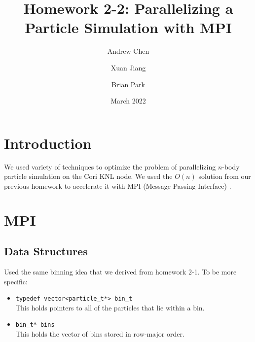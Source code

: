 \documentclass{article}
\title{Homework 2-2: Parallelizing a Particle Simulation with MPI}
\author{Andrew Chen}
\author{Xuan Jiang}
\author{Brian Park}
\affil{UC Berkeley, Computer Science 267}
\date{March 2022}
\begin{document}
\maketitle
\section{Introduction}
We used variety of techniques to optimize the problem of parallelizing $n$-body particle simulation on the Cori KNL node. We used the $O(n)$ solution from our previous homework to accelerate it with MPI (Message Passing Interface) \cite{mpi}.

\section{MPI} 

\subsection{Data Structures}
Used the same binning idea that we derived from homework 2-1. To be more specific:

\begin{itemize}
    \item \verb|typedef vector<particle_t*> bin_t| \\
        This holds pointers to all of the particles that lie within a bin.
    \item \verb|bin_t* bins| \\
        This holds the vector of bins stored in row-major order.
\end{itemize}
\end{document}
